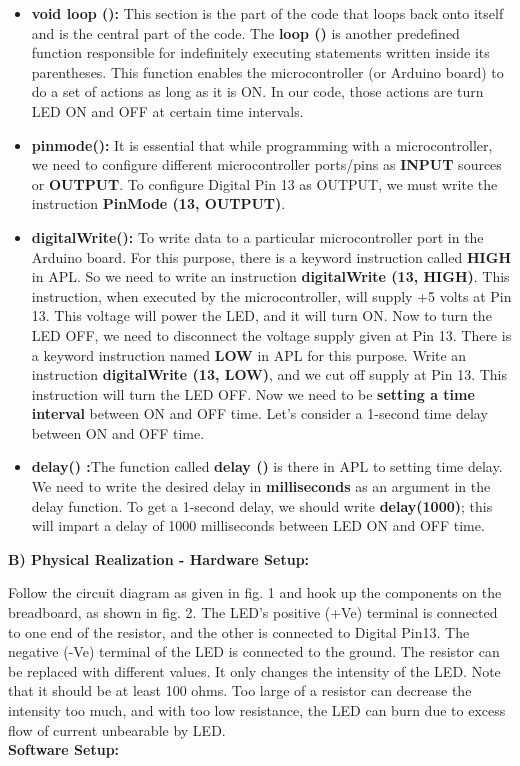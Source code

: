 \documentclass[12pt,a4paper]{article}
\begin{document}
\begin{justify}
\begin{enumerate}
\begin{itemize}
      \item \textbf{void loop ():} This section is the part of the code that loops back onto itself and is the central part of the code. The \textbf{loop ()} is another predefined function responsible for indefinitely executing statements written inside its parentheses. This function enables the microcontroller (or Arduino board) to do a set of actions as long as it is ON. In our code, those actions are turn LED ON and OFF at certain time intervals.
      
      \item \textbf{pinmode():} It is essential that while programming with a microcontroller, we need to configure different microcontroller ports/pins as \textbf{INPUT} sources or \textbf{OUTPUT}. To configure Digital Pin 13 as OUTPUT, we must write the instruction \textbf{PinMode (13, OUTPUT)}.
      
      \item \textbf{digitalWrite():} To write data to a particular microcontroller port in the Arduino board. For this purpose, there is a keyword instruction called \textbf{HIGH} in APL. So we need to write an instruction \textbf{digitalWrite (13, HIGH)}. This instruction, when executed by the microcontroller, will supply +5 volts at Pin 13. This voltage will power the LED, and it will turn ON. Now to turn the LED OFF, we need to disconnect the voltage supply given at Pin 13. There is a keyword instruction named \textbf{LOW} in APL for this purpose. Write an instruction \textbf{digitalWrite (13, LOW)}, and we cut off supply at Pin 13. This instruction will turn the LED OFF. Now we need to be \textbf{setting a time interval} between ON and OFF time. Let's consider a 1-second time delay between ON and OFF time. 
      \item \textbf{delay() :}The function called \textbf{delay ()} is there in APL to setting time delay. We need to write the desired delay in \textbf{milliseconds} as an argument in the delay function. To get a 1-second delay, we should write \textbf{delay(1000)}; this will impart a delay of 1000 milliseconds between LED ON and OFF time.
   \end{itemize}
\end{enumerate}

\noindent \textbf{B)	Physical Realization - Hardware Setup:}

\noindent Follow the circuit diagram as given in fig. 1 and hook up the components on the breadboard, as shown in fig. 2. The LED's positive (+Ve) terminal is connected to one end of the resistor, and the other is connected to Digital Pin13. The negative (-Ve) terminal of the LED is connected to the ground. The resistor can be replaced with different values. It only changes the intensity of the LED. Note that it should be at least 100 ohms. Too large of a resistor can decrease the intensity too much, and with too low resistance, the LED can burn due to excess flow of current unbearable by LED.\\[6pt]
\noindent \textbf{Software Setup:}


\end{justify}
\end{document}
